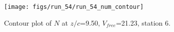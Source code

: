 \begin{figure}[H]
\centering
\texttt{[image: figs/run\_54/run\_54\_num\_contour]}
\caption{Contour plot of $N$ at $z/c$=9.50, $V_{free}$=21.23, station 6.}
\label{fig:run_54_num_contour}
\end{figure}


